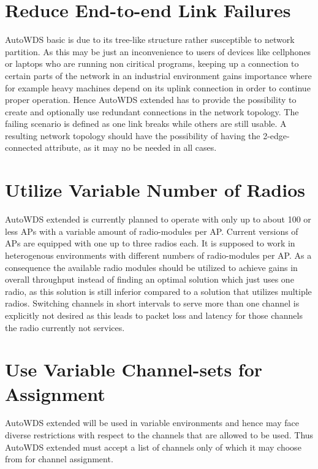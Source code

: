   \section{Reduce End-to-end Link Failures}
  \label{regendtoend}
  AutoWDS basic is due to its tree-like structure rather susceptible to network partition.
  As this may be just an inconvenience to users of devices like cellphones or laptops who are running non ciritical programs, 
  keeping up a connection to certain parts of the network in an industrial environment gains importance where for example heavy machines depend on its uplink connection in order 
  to continue proper operation. Hence AutoWDS extended has to provide the possibility to create and optionally use
  redundant connections in the network topology. The failing scenario is defined as one link breaks while others are still usable.
  A resulting network topology should have the possibility of having the 2-edge-connected attribute, as it may no be needed in all cases.
  
  \section{Utilize Variable Number of Radios}
  \label{utilvarnumradio}
  AutoWDS extended is currently planned to operate with only up to about 100 or less APs with a variable amount of radio-modules per \ac{AP}.
  Current versions of APs are equipped with one up to three radios each. It is supposed to work in heterogenous environments with 
  different numbers of radio-modules per \ac{AP}. As a consequence the available radio modules 
  should be utilized to achieve gains in overall throughput instead of finding an optimal solution which just uses one radio, as this solution is
  still inferior compared to a solution that utilizes multiple radios.
  Switching channels in short intervals to serve more than one channel is explicitly not desired as this leads to packet loss and latency for those channels the radio
  currently not services.
  
  \section{Use Variable Channel-sets for Assignment}
  AutoWDS extended will be used in variable environments and hence may face diverse restrictions with respect to the channels that are allowed to be used.
  Thus AutoWDS extended must accept a list of channels only of which it may choose from for channel assignment.
  
